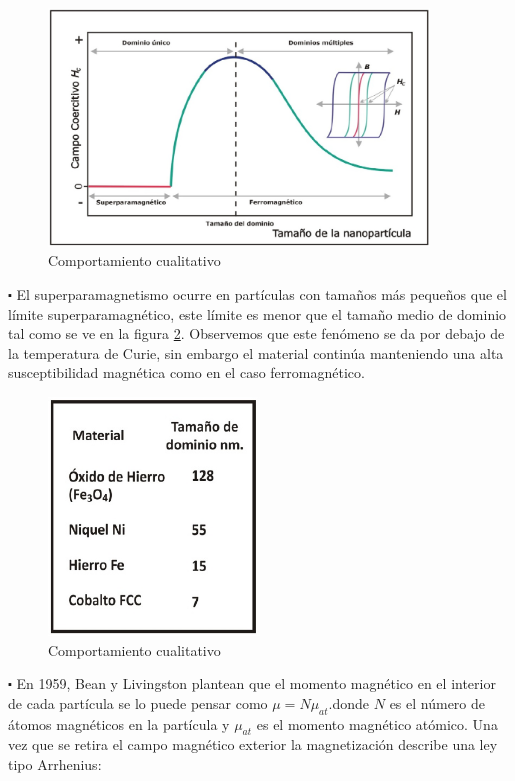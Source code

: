 \begin{figure}[H]
    \centering
    \includegraphics[width=0.9\textwidth]{./Figures/fig34}
	\caption{Comportamiento cualitativo}
	\label{fig:34}    
\end{figure}

$\centerdot$ El superparamagnetismo ocurre en partículas con tamaños más pequeños que el límite superparamagnético, este límite es menor que el tamaño medio de dominio tal como se ve en la figura \ref{fig:35}. Observemos que este fenómeno se da por debajo de la temperatura de Curie, sin embargo el material continúa manteniendo una alta susceptibilidad magnética como en el caso ferromagnético.

\begin{figure}[H]
    \centering
    \includegraphics[width=0.5\textwidth]{./Figures/fig35}
	\caption{Comportamiento cualitativo}
	\label{fig:35}    
\end{figure}

$\centerdot$ En 1959, Bean y Livingston plantean que el momento magnético en el interior de cada partícula se lo puede pensar como $\mu=N\mu_{at}$.donde $N$ es el número de átomos magnéticos en la partícula y $\mu_{at}$ es el momento magnético atómico. Una vez que se retira el campo magnético exterior la magnetización describe una ley tipo Arrhenius:


